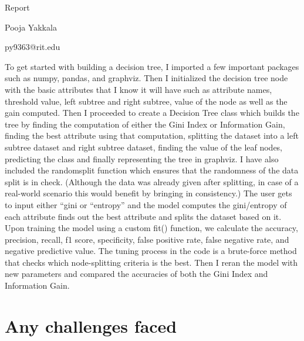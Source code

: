 \documentclass[a4paper]{article}
\begin{document}
\begin{titlepage}
\begin{center} 

        \Huge{Report} \vspace{1cm} 
        
        \large{Pooja Yakkala} \vspace{0.3cm}

        \large{py9363@rit.edu} \vspace{0.3cm} 
        
        
    \end{center} 
\end{titlepage} 

To get started with building a decision tree, I imported a few important packages such as numpy, pandas, and graphviz. Then I initialized the decision tree node with the basic attributes that I know it will have such as attribute names, threshold value, left subtree and right subtree, value of the node as well as the gain computed. Then I proceeded to create a Decision Tree class which builds the tree by finding the computation of either the Gini Index or Information Gain, finding the best attribute using that computation, splitting the dataset into a left subtree dataset and right subtree dataset, finding the value of the leaf nodes, predicting the class and finally representing the tree in graphviz. I have also included the randomsplit function which ensures that the randomness of the data split is in check. (Although the data was already given after splitting, in case of a real-world scenario this would benefit by bringing in consistency.) The user gets to input either “gini or “entropy” and the model computes the gini/entropy of each attribute finds out the best attribute and splits the dataset based on it. Upon training the model using a custom fit() function, we calculate the accuracy, precision, recall, f1 score, specificity, false positive rate, false negative rate, and negative predictive value. The tuning process in the code is a brute-force method that checks which node-splitting criteria is the best. Then I reran the model with new parameters and compared the accuracies of both the Gini Index and Information Gain.

\section*{Any challenges faced}
\end{document}
